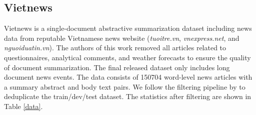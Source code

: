 \documentclass[11pt,a4paper]{article}
\begin{document}
\subsection{Vietnews}
Vietnews \cite{vietnews} is a single-document abstractive summarization dataset including news data from reputable Vietnamese news website (\textit{tuoitre.vn}, \textit{vnexpress.net}, and \textit{nguoiduatin.vn}). 
The authors of this work removed all articles related to questionnaires, analytical comments, and weather forecasts to ensure the quality of document summarization. The final released dataset only includes long document news events. The data consists of 150704 word-level news articles with a summary abstract and body text pairs. We follow the filtering pipeline by \citet{bartpho} to deduplicate the train/dev/test dataset. The statistics after filtering are shown in Table \ref{data}.
\end{document}
